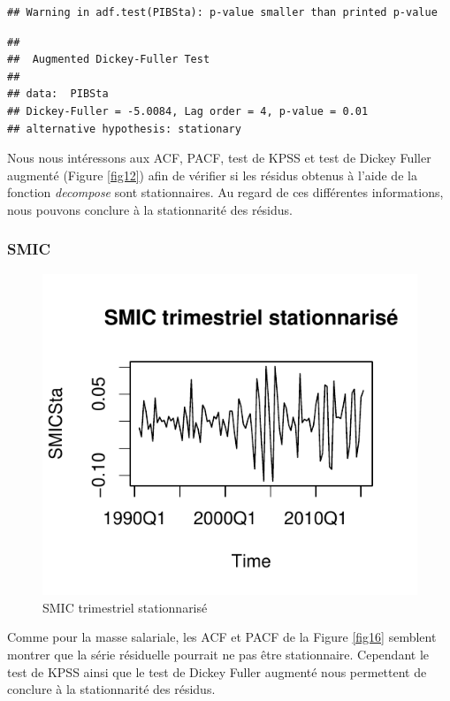 \documentclass[11pt,]{article}
\begin{document}
\begin{verbatim}
## Warning in adf.test(PIBSta): p-value smaller than printed p-value
\end{verbatim}

\begin{verbatim}
## 
##  Augmented Dickey-Fuller Test
## 
## data:  PIBSta
## Dickey-Fuller = -5.0084, Lag order = 4, p-value = 0.01
## alternative hypothesis: stationary
\end{verbatim}

Nous nous intéressons aux ACF, PACF, test de KPSS et test de Dickey
Fuller augmenté (Figure \ref{fig12}) afin de vérifier si les résidus
obtenus à l'aide de la fonction \emph{decompose} sont stationnaires. Au
regard de ces différentes informations, nous pouvons conclure à la
stationnarité des résidus.

\subsubsection{SMIC}\label{smic-1}

\begin{figure}[htbp]
\centering
\includegraphics{doc_files/figure-latex/unnamed-chunk-18-1.pdf}
\caption{\label{fig15} SMIC trimestriel stationnarisé}
\end{figure}

Comme pour la masse salariale, les ACF et PACF de la Figure \ref{fig16}
semblent montrer que la série résiduelle pourrait ne pas être
stationnaire. Cependant le test de KPSS ainsi que le test de Dickey
Fuller augmenté nous permettent de conclure à la stationnarité des
résidus.
\end{document}
